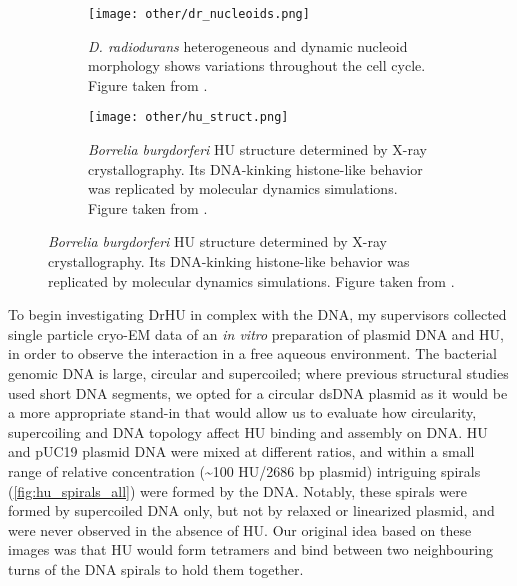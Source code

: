 \begin{figure}[ht]
    \centering
    \begin{subfigure}[B]{.48\textwidth}
        \centering
        \texttt{[image: other/dr\_nucleoids.png]}
        \caption{\textit{D. radiodurans} heterogeneous and dynamic nucleoid morphology shows variations throughout the cell cycle. Figure taken from \citet{flochCellMorphologyNucleoid2019}.}
        \label{fig:hu_nucleoids}
    \end{subfigure}%
    \hfill
    \begin{subfigure}[B]{.5\textwidth}
        \centering
        \texttt{[image: other/hu\_struct.png]}
        \caption{\textit{Borrelia burgdorferi} HU structure determined by X-ray crystallography. Its DNA-kinking histone-like behavior was replicated by molecular dynamics simulations. Figure taken from \citet{hognonMolecularBasesDNA2019}.}
        \label{fig:hu_structure}
    \end{subfigure}%
    \label{fig:hu}
\end{figure}

To begin investigating DrHU in complex with the DNA, my supervisors collected single particle cryo-EM data of an \textit{in vitro} preparation of plasmid DNA and HU, in order to observe the interaction in a free aqueous environment.
The bacterial genomic DNA is large, circular and supercoiled; where previous structural studies used short DNA segments, we opted for a circular dsDNA plasmid as it would be a more appropriate stand-in that would allow us to evaluate how circularity, supercoiling and DNA topology affect HU binding and assembly on DNA.
HU and pUC19 plasmid DNA were mixed at different ratios, and within a small range of relative concentration (\sim100 HU/2686 bp plasmid) intriguing spirals (\autoref{fig:hu_spirals_all}) were formed by the DNA.
Notably, these spirals were formed by supercoiled DNA only, but not by relaxed or linearized plasmid, and were never observed in the absence of HU.
Our original idea based on these images was that HU would form tetramers and bind between two neighbouring turns of the DNA spirals to hold them together.

